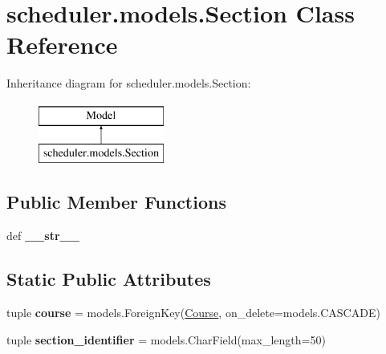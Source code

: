 \hypertarget{classscheduler_1_1models_1_1_section}{\section{scheduler.\-models.\-Section Class Reference}
\label{classscheduler_1_1models_1_1_section}
}
Inheritance diagram for scheduler.\-models.\-Section\-:\begin{figure}[H]
\begin{center}
\leavevmode
\includegraphics[height=2.000000cm]{classscheduler_1_1models_1_1_section}
\end{center}
\end{figure}
\subsection*{Public Member Functions}
\begin{DoxyCompactItemize}
\item 
\hypertarget{classscheduler_1_1models_1_1_section_a246a1f55dd3ce2f8b7e22b381535e09d}{def {\bfseries \-\_\-\-\_\-str\-\_\-\-\_\-}}\label{classscheduler_1_1models_1_1_section_a246a1f55dd3ce2f8b7e22b381535e09d}

\end{DoxyCompactItemize}
\subsection*{Static Public Attributes}
\begin{DoxyCompactItemize}
\item 
\hypertarget{classscheduler_1_1models_1_1_section_ac4fd835769f6add9617f8885b0d225fe}{tuple {\bfseries course} = models.\-Foreign\-Key(\hyperlink{classscheduler_1_1models_1_1_course}{Course}, on\-\_\-delete=models.\-C\-A\-S\-C\-A\-D\-E)}\label{classscheduler_1_1models_1_1_section_ac4fd835769f6add9617f8885b0d225fe}

\item 
\hypertarget{classscheduler_1_1models_1_1_section_a4f971f52de3c5f0d4c5e99328edca1f7}{tuple {\bfseries section\-\_\-identifier} = models.\-Char\-Field(max\-\_\-length=50)}\label{classscheduler_1_1models_1_1_section_a4f971f52de3c5f0d4c5e99328edca1f7}

\end{DoxyCompactItemize}


